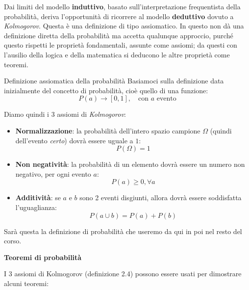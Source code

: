 \documentclass[a4paper,11pt]{article}
\begin{document}
Dai limiti del modello \textbf{induttivo}, basato sull’interpretazione frequentista della probabilità, deriva l’opportunità di ricorrere al modello \textbf{deduttivo} dovuto a \textit{Kolmogorov}. Questa è una definizione di tipo assiomatico. In questo non dà una definizione diretta della probabilità 
ma accetta qualunque approccio, purché questo rispetti le proprietà fondamentali, assunte come assiomi; da questi con l’ausilio della logica e della matematica si deducono le altre proprietà come teoremi.

\begin{definition}{Definizione assiomatica della probabilità}
Basiamoci sulla definizione data inizialmente del concetto di probabilità, cioè quello di una funzione:
$$
P(a) \rightarrow [0, 1], \quad \text{con $a$ evento}
$$

\tcblower

Diamo quindi i 3 assiomi di \textit{Kolmogorov}:
\begin{itemize}
	\item \textbf{Normalizzazione}: la probabilità dell'intero spazio campione $\Omega$ (quindi dell'evento \textit{certo}) dovrà essere uguale a $1$:
		$$
			P(\Omega) = 1
		$$
	\item \textbf{Non negatività}: la probabilità di un elemento dovrà essere un numero non negativo, per ogni evento $a$:
		$$
			P(a) \geq 0, \forall a
		$$
	\item \textbf{Additività}: se $a$ e $b$ sono 2 eventi disgiunti, allora dovrà essere soddisfatta l'uguaglianza:
		$$
			P(a \cup b) = P(a) + P(b)
		$$
\end{itemize}
\end{definition}

Sarà questa la definizione di probabilità che useremo da qui in poi nel resto del corso.

\par\smallskip

\noindent
\textbf{\textsf{Teoremi di probabilità}}

\noindent
I 3 assiomi di Kolmogorov (definizione 2.4) possono essere usati per dimostrare alcuni teoremi:
\end{document}
